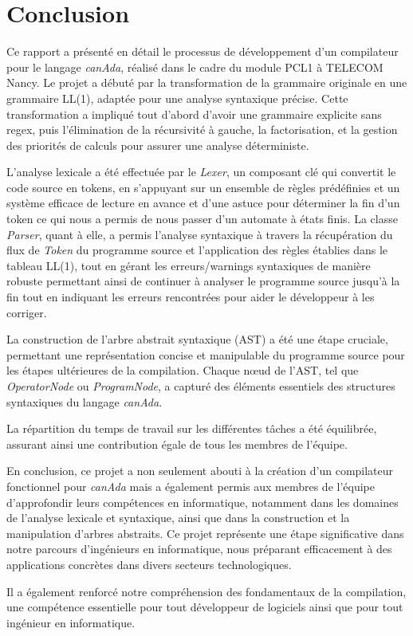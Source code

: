 \documentclass[french,a4paper]{article}
\begin{document}
    \section{Conclusion}\label{sec:conclusion}
    Ce rapport a présenté en détail le processus de développement d'un compilateur pour le langage \textit{canAda}, réalisé dans le cadre du module PCL1 à TELECOM Nancy.
    Le projet a débuté par la transformation de la grammaire originale en une grammaire LL(1), adaptée pour une analyse syntaxique précise.
    Cette transformation a impliqué tout d'abord d'avoir une grammaire explicite sans regex, puis l'élimination de la récursivité à gauche, la factorisation, et la gestion des priorités de calculs pour assurer une analyse déterministe.

    L'analyse lexicale a été effectuée par le \textit{Lexer}, un composant clé qui convertit le code source en tokens, en s'appuyant sur un ensemble de règles prédéfinies et un système efficace de lecture en avance et d'une astuce pour déterminer la fin d'un token ce qui nous a permis de nous passer d'un automate à états finis.
    La classe \textit{Parser}, quant à elle, a permis l'analyse syntaxique à travers la récupération du flux de \textit{Token} du programme source et l'application des règles établies dans le tableau LL(1), tout en gérant les erreurs/warnings syntaxiques de manière robuste permettant ainsi de continuer à analyser le programme source jusqu'à la fin tout en indiquant les erreurs rencontrées pour aider le développeur à les corriger.

    La construction de l'arbre abstrait syntaxique (AST) a été une étape cruciale, permettant une représentation concise et manipulable du programme source pour les étapes ultérieures de la compilation.
    Chaque nœud de l'AST, tel que \textit{OperatorNode} ou \textit{ProgramNode}, a capturé des éléments essentiels des structures syntaxiques du langage \textit{canAda}.

    La répartition du temps de travail sur les différentes tâches a été équilibrée, assurant ainsi une contribution égale de tous les membres de l'équipe.

    En conclusion, ce projet a non seulement abouti à la création d'un compilateur fonctionnel pour \textit{canAda} mais a également permis aux membres de l'équipe d'approfondir leurs compétences en informatique, notamment dans les domaines de l'analyse lexicale et syntaxique, ainsi que dans la construction et la manipulation d'arbres abstraits.
    Ce projet représente une étape significative dans notre parcours d'ingénieurs en informatique, nous préparant efficacement à des applications concrètes dans divers secteurs technologiques.

    Il a également renforcé notre compréhension des fondamentaux de la compilation, une compétence essentielle pour tout développeur de logiciels ainsi que pour tout ingénieur en informatique.
\end{document}
